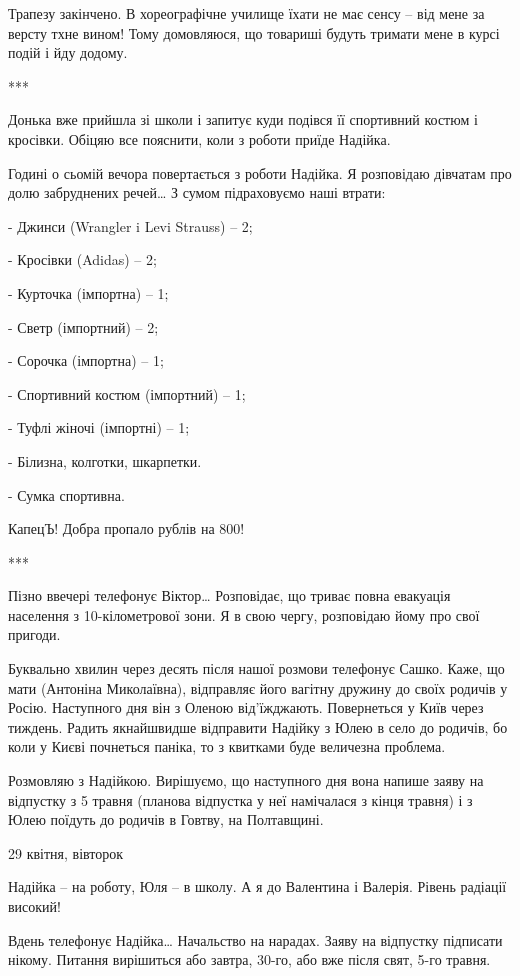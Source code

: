 Трапезу закінчено. В хореографічне училище їхати не має сенсу – від мене за
версту тхне вином! Тому домовляюся, що товариші будуть тримати мене в курсі
подій і йду додому. 

***

Донька вже прийшла зі школи і запитує куди подівся її спортивний костюм і
кросівки. Обіцяю все пояснити, коли з роботи приїде Надійка. 

Годині о сьомій вечора повертається з роботи Надійка. Я розповідаю дівчатам про
долю забруднених речей… З сумом підраховуємо наші втрати:

- Джинси (Wrangler i Levi Strauss) – 2;

- Кросівки (Adidas) – 2;

- Курточка (імпортна) – 1;

- Светр (імпортний) – 2;

- Сорочка (імпортна) – 1;

- Спортивний костюм (імпортний) – 1;

- Туфлі жіночі (імпортні) – 1;

- Білизна, колготки, шкарпетки.

- Сумка спортивна.

КапецЪ! Добра пропало рублів на 800! 

***

Пізно ввечері телефонує Віктор… Розповідає, що триває повна евакуація населення
з 10-кілометрової зони. Я в свою чергу, розповідаю йому про свої пригоди. 

Буквально хвилин через десять після нашої розмови телефонує Сашко. Каже, що
мати (Антоніна Миколаївна), відправляє його вагітну дружину до своїх родичів у
Росію. Наступного дня він з Оленою від’їжджають. Повернеться у Київ через
тиждень. Радить якнайшвидше відправити Надійку з Юлею в село до родичів, бо
коли у Києві почнеться паніка, то з квитками буде величезна проблема.

Розмовляю з Надійкою. Вирішуємо, що наступного дня вона напише заяву на
відпустку з 5 травня (планова відпустка у неї намічалася з кінця травня) і з
Юлею поїдуть до родичів в Говтву, на Полтавщині. 

29 квітня, вівторок

Надійка – на роботу, Юля – в школу. А я до Валентина і Валерія. Рівень радіації
високий!

Вдень телефонує Надійка… Начальство на нарадах. Заяву на відпустку підписати
нікому. Питання вирішиться або завтра, 30-го, або вже після свят, 5-го травня. 


